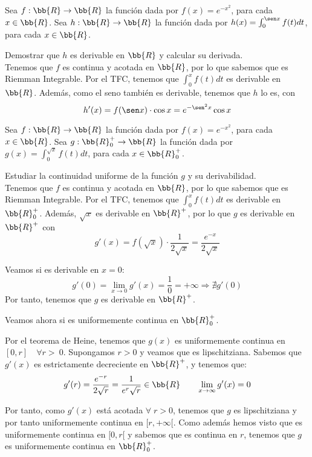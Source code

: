 \begin{ejercicio}
    Sea $f:\bb{R}\to \bb{R}$ la función dada por $f(x)=e^{-x^2}$, para cada $x\in \bb{R}$. Sea $h:\bb{R}\to \bb{R}$ la función dada por $h(x)=\int_0^{\sen x}f(t)dt$, para cada $x\in \bb{R}$.

    Demostrar que $h$ es derivable en $\bb{R}$ y calcular su derivada.\\
    
    Tenemos que $f$ es continua y acotada en $\bb{R}$, por lo que sabemos que es Riemman Integrable. Por el TFC, tenemos que $\int_0^{x}f(t)dt$ es derivable en $\bb{R}$. Además, como el seno también es derivable, tenemos que $h$ lo es, con
    \begin{equation*}
        h'(x) = f(\sen x)\cdot \cos x = e^{-\sen^2 x}\cos x
    \end{equation*}
\end{ejercicio}

\begin{ejercicio}
    Sea $f:\bb{R}\to \bb{R}$ la función dada por $f(x)=e^{-x^2}$, para cada $x\in \bb{R}$. Sea $g:\bb{R}^+_0\to \bb{R}$ la función dada por $g(x)=\int_0^{\sqrt{x}}f(t)dt$, para cada $x\in \bb{R}^+_0$.

    Estudiar la continuidad uniforme de la función $g$ y su derivabilidad.\\

    Tenemos que $f$ es continua y acotada en $\bb{R}$, por lo que sabemos que es Riemman Integrable. Por el TFC, tenemos que $\int_0^{x}f(t)dt$ es derivable en $\bb{R}^+_0$. Además, $\sqrt{x}$ es derivable en $\bb{R}^+$, por lo que $g$ es derivable en $\bb{R}^+$ con
    \begin{equation*}
        g'(x) = f(\sqrt{x})\cdot \frac{1}{2\sqrt{x}} = \frac{e^{-x}}{2\sqrt{x}}
    \end{equation*}

    Veamos si es derivable en $x=0$:
    \begin{equation*}
        g'(0)=\lim_{x\to 0}g'(x) = \frac{1}{0} = +\infty \Longrightarrow \nexists g'(0)
    \end{equation*}
    Por tanto, tenemos que $g$ es derivable en $\bb{R}^+$.

    \vspace{1cm} Veamos ahora si es uniformemente continua en $\bb{R}^+_0$. 

    Por el teorema de Heine, tenemos que $g(x)$ es uniformemente continua en $[0,r]\quad \forall r>~0$. Supongamos $r>0$ y veamos que es lipschitziana. Sabemos que $g'(x)$ es estrictamente decreciente en $\bb{R}^+$, y tenemos que:
    \begin{equation*}
        g'(r)=\frac{e^{-r}}{2\sqrt{r}} = \frac{1}{e^r \sqrt{r}}\in \bb{R}
        \qquad \lim_{x\to \infty}g'(x)=0
    \end{equation*}

    Por tanto, como $g'(x)$ está acotada $\forall \;r>0$, tenemos que $g$ es lipschitziana y por tanto uniformemente continua en $[r,+\infty[$. Como además hemos visto que es uniformemente continua en $[0,r[$ y sabemos que es continua en $r$, tenemos que $g$ es uniformemente continua en $\bb{R}^+_0$.
    
\end{ejercicio}

